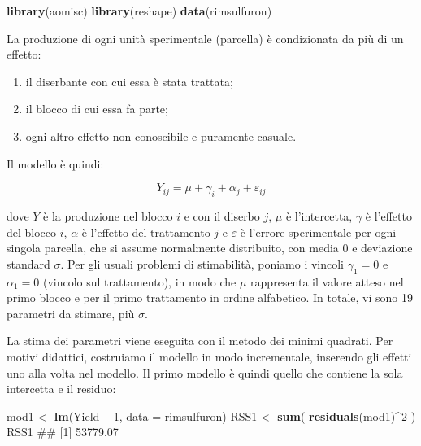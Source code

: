 \documentclass[a4paper,12pt,oneside]{book}
\providecommand{\tightlist}{%
  \setlength{\itemsep}{0pt}\setlength{\parskip}{0pt}}
\newenvironment{Shaded}{\begin{snugshade}}{\end{snugshade}}
\newcommand{\KeywordTok}[1]{\textcolor[rgb]{0.13,0.29,0.53}{\textbf{#1}}}
\newcommand{\DataTypeTok}[1]{\textcolor[rgb]{0.13,0.29,0.53}{#1}}
\newcommand{\DecValTok}[1]{\textcolor[rgb]{0.00,0.00,0.81}{#1}}
\newcommand{\StringTok}[1]{\textcolor[rgb]{0.31,0.60,0.02}{#1}}
\newcommand{\OperatorTok}[1]{\textcolor[rgb]{0.81,0.36,0.00}{\textbf{#1}}}
\newcommand{\NormalTok}[1]{#1}
\theoremstyle{definition}
\theoremstyle{definition}
\theoremstyle{definition}
\theoremstyle{remark}
\begin{document}
\begin{Shaded}
\begin{Highlighting}[]
\KeywordTok{library}\NormalTok{(aomisc)}
\KeywordTok{library}\NormalTok{(reshape)}
\KeywordTok{data}\NormalTok{(rimsulfuron)}
\end{Highlighting}
\end{Shaded}

La produzione di ogni unità sperimentale (parcella) è condizionata da
più di un effetto:

\begin{enumerate}
\def\labelenumi{\arabic{enumi}.}
\tightlist
\item
  il diserbante con cui essa è stata trattata;
\item
  il blocco di cui essa fa parte;
\item
  ogni altro effetto non conoscibile e puramente casuale.
\end{enumerate}

Il modello è quindi:

\[ Y_{ij} = \mu + \gamma_i + \alpha_j + \varepsilon_{ij}\]

dove \(Y\) è la produzione nel blocco \(i\) e con il diserbo \(j\),
\(\mu\) è l'intercetta, \(\gamma\) è l'effetto del blocco \(i\),
\(\alpha\) è l'effetto del trattamento \(j\) e \(\varepsilon\) è
l'errore sperimentale per ogni singola parcella, che si assume
normalmente distribuito, con media 0 e deviazione standard \(\sigma\).
Per gli usuali problemi di stimabilità, poniamo i vincoli
\(\gamma_1 = 0\) e \(\alpha_1 = 0\) (vincolo sul trattamento), in modo
che \(\mu\) rappresenta il valore atteso nel primo blocco e per il primo
trattamento in ordine alfabetico. In totale, vi sono 19 parametri da
stimare, più \(\sigma\).

La stima dei parametri viene eseguita con il metodo dei minimi quadrati.
Per motivi didattici, costruiamo il modello in modo incrementale,
inserendo gli effetti uno alla volta nel modello. Il primo modello è
quindi quello che contiene la sola intercetta e il residuo:

\begin{Shaded}
\begin{Highlighting}[]
\NormalTok{mod1 <-}\StringTok{ }\KeywordTok{lm}\NormalTok{(Yield }\OperatorTok{~}\StringTok{ }\DecValTok{1}\NormalTok{, }\DataTypeTok{data =}\NormalTok{ rimsulfuron)}
\NormalTok{RSS1 <-}\StringTok{ }\KeywordTok{sum}\NormalTok{( }\KeywordTok{residuals}\NormalTok{(mod1)}\OperatorTok{^}\DecValTok{2}\NormalTok{ )}
\NormalTok{RSS1}
\NormalTok{## [1] 53779.07}
\end{Highlighting}
\end{Shaded}
\end{document}
